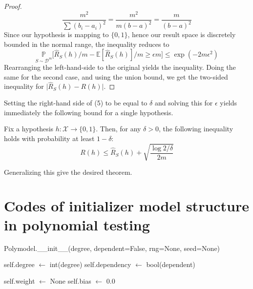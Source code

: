 \documentclass[10pt]{article}
\begin{document}
\begin{proof}
\begin{equation*}
        \frac{m^{2}}{\sum (b_{i} - a_{i})^{2}} = \frac{m^{2}}{m(b-a)^{2}} = \frac{m}{(b-a)^{2}}
    \end{equation*}
    Since our hypothesis is mapping to $\{0,1\}$, hence our result space is discretely bounded in the normal range, the inequality reduces to 
    \begin{equation}
        \underset{S\sim \mathcal{D}^{m}}{\mathbb{P}} \Big[ \hat{R}_{S}(h)/m - \mathbb{E}[\hat{R}_{S}(h)]/m \geq \epsilon m \Big] \leq \exp{\left(-2m\epsilon^{2}\right)}
    \end{equation}
    Rearranging the left-hand-side to the original yields the inequality. Doing the same for the second case, and using the union bound, we get the two-sided inequality for $\lvert \hat{R}_{S}(h) - R(h)\rvert$. 
\end{proof}

Setting the right-hand side of (5) to be equal to $\delta$ and solving this for $\epsilon$ yields immediately the following bound for a single hypothesis. 

\begin{col}
    Fix a hypothesis $h: \mathcal{X}\to \{0,1\}$. Then, for any $\delta > 0$, the following inequality holds with probability at least $1-\delta$: 
    \begin{equation}
        R(h) \leq \hat{R}_S(h) + \sqrt{\frac{\log{2/\delta}}{2m}}
    \end{equation}
\end{col}

Generalizing this give the desired theorem.

\section{Codes of initializer model structure in polynomial testing}
\begin{algorithm}[H]
\caption{\textsf{Polymodel.\_\_init\_\_}(degree, dependent=False, rng=None, seed=None)}


self.degree $\leftarrow$ int(degree)\;
self.dependency $\leftarrow$ bool(dependent)\;


self.weight $\leftarrow$ None 
self.bias $\leftarrow$ 0.0\;

\end{algorithm}
\end{document}
